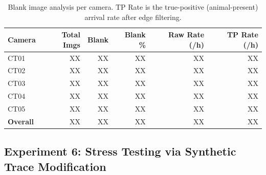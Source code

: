 \documentclass[letterpaper,twocolumn,10pt]{article}
\begin{document}
\begin{table}[t]
\centering
\begin{tabular}{p{1.5cm} r r r r r}
\toprule
\textbf{Camera} & \textbf{Total Imgs} & \textbf{Blank} & \textbf{Blank \%} & \textbf{Raw Rate (/h)} & \textbf{TP Rate (/h)} \\
\midrule
CT01 & XX & XX & XX & XX & XX \\
CT02 & XX & XX & XX & XX & XX \\
CT03 & XX & XX & XX & XX & XX \\
CT04 & XX & XX & XX & XX & XX \\
CT05 & XX & XX & XX & XX & XX \\
\midrule
\textbf{Overall} & XX & XX & XX & XX & XX \\
\bottomrule
\end{tabular}
\caption{Blank image analysis per camera. TP Rate is the true-positive (animal-present) arrival rate after edge filtering.}
\label{table:blank_images}
\end{table}



\subsection{Experiment 6: Stress Testing via Synthetic Trace Modification}


\end{document}
